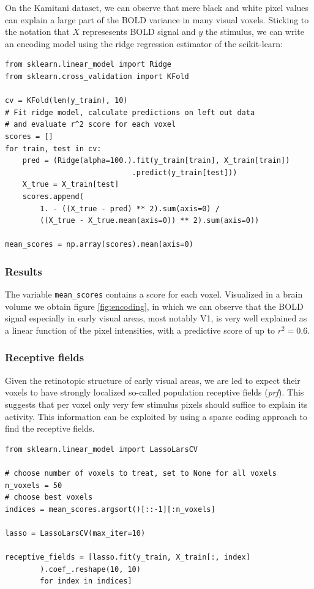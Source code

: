\documentclass{frontiersSCNS} %
\newcounter{x}
\newcounter{y}
\newcounter{z}
\begin{document}
On the Kamitani dataset, we can observe that mere black and white pixel values can explain a large part of the BOLD variance in many visual voxels. Sticking to the notation that \(X\) represesents BOLD signal and \(y\) the stimulus, we can write an encoding model using the ridge regression estimator of the scikit-learn:

\begin{lstlisting}
from sklearn.linear_model import Ridge
from sklearn.cross_validation import KFold

cv = KFold(len(y_train), 10)
# Fit ridge model, calculate predictions on left out data
# and evaluate r^2 score for each voxel
scores = []
for train, test in cv:
    pred = (Ridge(alpha=100.).fit(y_train[train], X_train[train])
                             .predict(y_train[test]))
    X_true = X_train[test]
    scores.append(
        1. - ((X_true - pred) ** 2).sum(axis=0) /
        ((X_true - X_true.mean(axis=0)) ** 2).sum(axis=0))
    
mean_scores = np.array(scores).mean(axis=0)
\end{lstlisting}

\subsubsection{Results}
The variable \texttt{mean\_scores} contains a score for each voxel. Visualized in a brain volume we obtain figure \ref{fig:encoding}, in which we can observe that the BOLD signal especially in early visual areas, most notably V1, is very well explained as a linear function of the pixel intensities, with a predictive score of up to \(r^2 = 0.6\).

\subsubsection{Receptive fields}
Given the retinotopic structure of early visual areas, we are led to expect their voxels to have strongly localized so-called population receptive fields (\textit{prf}). This suggests that per voxel only very few stimulus pixels should suffice to explain its activity. This information can be exploited by using a sparse coding approach to find the receptive fields.

\begin{lstlisting}
from sklearn.linear_model import LassoLarsCV

# choose number of voxels to treat, set to None for all voxels
n_voxels = 50
# choose best voxels
indices = mean_scores.argsort()[::-1][:n_voxels]

lasso = LassoLarsCV(max_iter=10)

receptive_fields = [lasso.fit(y_train, X_train[:, index]
        ).coef_.reshape(10, 10)
        for index in indices]

\end{lstlisting}
\end{document}
